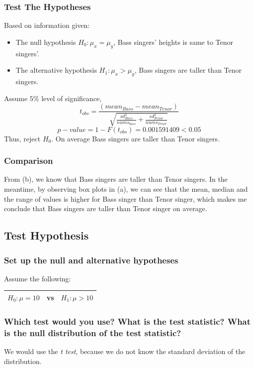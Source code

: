 \documentclass[11pt,letterpaper,titlepage,en-US]{article}
\begin{document}
\subsubsection{Test The Hypotheses}
Based on information given:
\begin{itemize}
    \item The null hypothesis $H_0: \mu_x = \mu_y$, Bass singers' heights is same to Tenor singers'.
    \item The alternative hypothesis $H_1: \mu_x > \mu_y$, Bass singers are taller than Tenor singers.
\end{itemize}
Assume $5\%$ level of significance,
\[t_{obs} = \frac{(mean_{Bass} - mean_{Tenor})}{\sqrt{\frac{sd_{Bass}^2}{nums_{bass}} + \frac{sd_{Tenor}^2}{nums_{Tenor}}}}\]
\[p-value = 1 - F(t_{obs}) = 0.001591409 < 0.05\]
Thus, reject $H_0$.
On average Bass singers are taller than Tenor singers.

\subsubsection{Comparison}
From (b), we know that Bass singers are taller than Tenor singers. In the meantime, by observing box plots in (a), we can see that the mean, median and the range of values is higher for Bass singer than Tenor singer, which makes me conclude that Bass singers are taller than Tenor singer on average.

\subsection{Test Hypothesis}
\subsubsection{Set up the null and alternative hypotheses}
Assume the following:

\begin{center}
\begin{tabular}{|rcl|}\hline
$H_0: \mu = 10$ & vs & $H_1: \mu > 10$\\\hline
\end{tabular}
\end{center}

\subsubsection{Which test would you use? What is the test statistic? What is the null distribution of the test statistic?}
We would use the \emph{t test}, because we do not know the standard deviation of the distribution.
\end{document}
